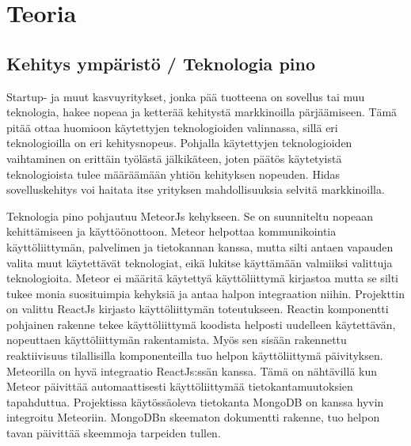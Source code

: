 \documentclass[11pt,a4paper,titlepage,oneside]{article}
\begin{document}
\newpage
\section{Teoria}                %



\subsection{Kehitys ympäristö / Teknologia pino}






Startup- ja muut kasvuyritykset, jonka pää tuotteena on sovellus tai muu teknologia, hakee nopeaa ja ketterää kehitystä markkinoilla pärjäämiseen.
Tämä pitää ottaa huomioon käytettyjen teknologioiden valinnassa, sillä eri teknologioilla on eri kehitysnopeus.
Pohjalla käytettyjen teknologioiden vaihtaminen on erittäin työlästä jälkikäteen,
joten päätös käytetyistä teknologioista tulee määräämään yhtiön kehityksen nopeuden.
Hidas sovelluskehitys voi haitata itse yrityksen mahdollisuuksia selvitä markkinoilla.
\medskip




Teknologia pino pohjautuu MeteorJs kehykseen. Se on suunniteltu nopeaan kehittämiseen ja käyttöönottoon.
Meteor helpottaa kommunikointia käyttöliittymän, palvelimen ja tietokannan kanssa, 
mutta silti antaen vapauden valita muut käytettävät teknologiat, eikä lukitse käyttämään valmiiksi valittuja teknologioita.
Meteor ei määritä käytettyä käyttöliittymä kirjastoa mutta se silti tukee monia suosituimpia kehyksiä ja antaa halpon integraation niihin.
Projekttin on valittu ReactJs kirjasto käyttöliittymän toteutukseen.
Reactin komponentti pohjainen rakenne tekee käyttöliittymä koodista helposti uudelleen käytettävän, nopeuttaen käyttöliittymän rakentamista. 
Myös sen sisään rakennettu reaktiivisuus tilallisilla komponenteilla tuo helpon käyttöliittymä päivityksen.
Meteorilla on hyvä integraatio ReactJs:ssän kanssa. 
Tämä on nähtävillä kun Meteor päivittää automaattisesti käyttöliittymää tietokantamuutoksien tapahduttua. 
Projektissa käytössäoleva tietokanta MongoDB on kanssa hyvin integroitu Meteoriin.
MongoDBn skeematon dokumentti rakenne, tuo helpon tavan päivittää skeemmoja tarpeiden tullen.
\medskip
\end{document}
